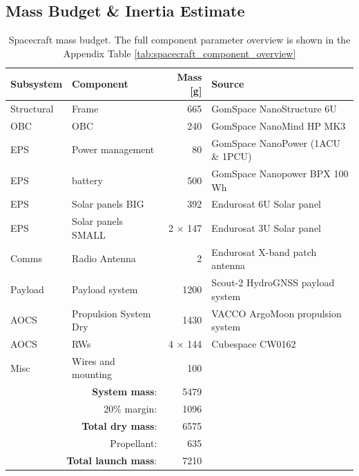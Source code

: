 \subsection{Mass Budget \& Inertia Estimate}

\begin{table}[htbp]
    \small
    \centering
    \caption{Spacecraft mass budget. The full component parameter overview is shown in the Appendix Table \ref{tab:spacecraft_component_overview}}
    \label{tab:spacecraft_mass_budget}
    \renewcommand{\arraystretch}{1.15}
    \setlength{\tabcolsep}{4pt}

    \begin{tabular}{llrl}
        \hline
        Subsystem & Component & Mass [g] & Source \\
        \hline

        Structural & Frame & 665 & GomSpace NanoStructure 6U\\
        OBC & OBC & 240 & GomSpace NanoMind HP MK3 \\
        EPS & Power management & 80 & GomSpace NanoPower (1ACU \& 1PCU) \\
        EPS & battery & 500 & GomSpace Nanopower BPX 100 Wh \\
        EPS & Solar panels BIG & 392 & Endurosat 6U Solar panel \\
        EPS & Solar panels SMALL & 2 $\times$ 147 & Endurosat 3U Solar panel \\
        Comms & Radio Antenna & 2 & Endurosat X-band patch antenna \\
        Payload & Payload system & 1200 & Scout-2 HydroGNSS payload system  \\
        AOCS & Propulsion System Dry & 1430 & VACCO ArgoMoon propulsion system \\
        AOCS & RWs & 4 $\times$ 144 & Cubespace CW0162 \\
        Misc & Wires and mounting & 100 &  \\
        \hline

        \multicolumn{2}{r}{\textbf{System mass}:} & 5479 &  \\
        \multicolumn{2}{r}{20\% margin:} & 1096 &  \\
        \multicolumn{2}{r}{\textbf{Total dry mass}:} & 6575 &  \\
        \multicolumn{2}{r}{Propellant:} & 635 &  \\
        \multicolumn{2}{r}{\textbf{Total launch mass}:} & 7210 &  \\
        \hline
    \end{tabular}
\end{table}


